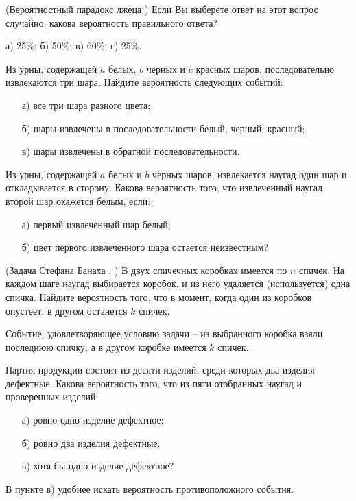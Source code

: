 \begin{problem}(Вероятностный парадокс лжеца \cite{book2012})
Если Вы выберете ответ на этот вопрос случайно, какова вероятность правильного ответа?

а) 25{\%}; б) 50{\%}; в) 60{\%}; г) 25{\%}.
\end{problem}

\begin{problem}
Из урны, содержащей $a$ белых, $b$ черных и $c$ красных шаров, последовательно извлекаются три шара. Найдите 
вероятность следующих событий: 
\begin{enumerate}
\item[а)] все три шара разного цвета; 
\item[б)] шары извлечены в последовательности белый, черный, красный; 
\item[в)] шары извлечены в обратной последовательности. 
\end{enumerate}
\end{problem}



\begin{problem}
Из урны, содержащей $a$ белых и $b$ черных шаров, извлекается наугад один шар и откладывается в сторону. Какова вероятность 
того, что извлеченный наугад второй шар окажется белым, если: 
\begin{enumerate}
\item[а)] первый извлеченный шар белый; 
\item[б)] цвет  первого извлеченного шара остается неизвестным? 
\end{enumerate}
\end{problem}


\begin{problem}(Задача Стефана Банаха \cite{2013}, \cite{29})
В двух спичечных коробках имеется по $n$ спичек. На каждом шаге наугад выбирается коробок, и из него удаляется (используется) 
одна спичка. Найдите вероятность того, что в момент, когда один из коробков опустеет, в другом останется $k$ спичек. 
\end{problem}

\begin{ordre}
Событие, удовлетворяющее условию задачи -- из выбранного коробка взяли последнюю спичку, а в другом коробке имеется $k$ спичек. 
\end{ordre}

\begin{problem}
Партия продукции состоит из десяти изделий, среди которых два изделия дефектные. Какова вероятность того, что из пяти отобранных 
наугад и проверенных изделий: 
\begin{enumerate}
\item[а)] ровно одно изделие дефектное; 
\item[б)] ровно два изделия дефектные; 
\item[в)] хотя бы одно изделие дефектное? 
\end{enumerate} 

\begin{ordre}
В пункте в) удобнее искать вероятность противоположного события.
\end{ordre}

\end{problem}

